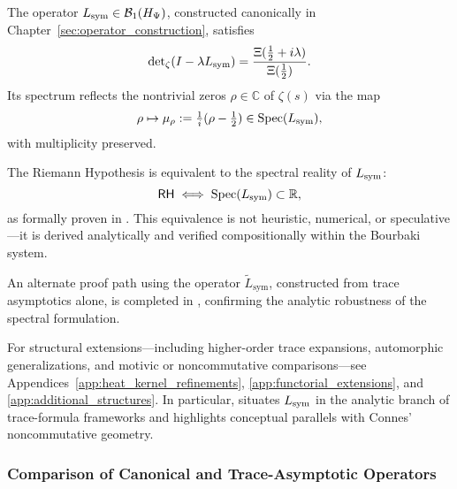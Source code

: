 \begin{tcolorbox}[colback=gray!2!white, colframe=black!50, title={\textbf{Canonical Equivalence — RH via Spectral Reality}}]
The operator \( L_{\mathrm{sym}} \in \mathcal{B}_1(H_{\Psi}) \), constructed canonically in Chapter~\ref{sec:operator_construction}, satisfies
\[
\det\nolimits_{\zeta}(I - \lambda L_{\mathrm{sym}}) = \frac{\Xi(\tfrac{1}{2} + i\lambda)}{\Xi(\tfrac{1}{2})}.
\]
Its spectrum reflects the nontrivial zeros \( \rho \in \mathbb{C} \) of \( \zeta(s) \) via the map
\[
\rho \mapsto \mu_\rho := \tfrac{1}{i}(\rho - \tfrac{1}{2}) \in \operatorname{Spec}(L_{\mathrm{sym}}),
\]
with multiplicity preserved.

\medskip

\noindent The Riemann Hypothesis is equivalent to the spectral reality of \( L_{\mathrm{sym}} \):
\[
\mathsf{RH} \iff \operatorname{Spec}(L_{\mathrm{sym}}) \subset \mathbb{R},
\]
as formally proven in . This equivalence is not heuristic, numerical, or speculative—it is derived analytically and verified compositionally within the Bourbaki system.

\medskip

\noindent An alternate proof path using the operator \( \tilde{L}_{\mathrm{sym}} \), constructed from trace asymptotics alone, is completed in , confirming the analytic robustness of the spectral formulation.
\end{tcolorbox}

\medskip

\noindent
For structural extensions—including higher-order trace expansions, automorphic generalizations, and motivic or noncommutative comparisons—see Appendices~\ref{app:heat_kernel_refinements}, \ref{app:functorial_extensions}, and \ref{app:additional_structures}. In particular,  situates \( L_{\mathrm{sym}} \) in the analytic branch of trace-formula frameworks and highlights conceptual parallels with Connes’ noncommutative geometry.

\subsubsection*{Comparison of Canonical and Trace-Asymptotic Operators}


